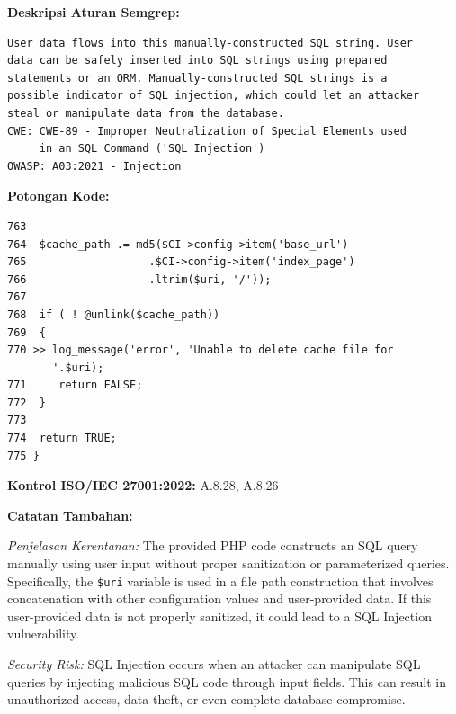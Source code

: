 \textbf{Deskripsi Aturan Semgrep:}
\begin{small}
\begin{lstlisting}[style=promptstyle]
User data flows into this manually-constructed SQL string. User
data can be safely inserted into SQL strings using prepared
statements or an ORM. Manually-constructed SQL strings is a
possible indicator of SQL injection, which could let an attacker
steal or manipulate data from the database.
CWE: CWE-89 - Improper Neutralization of Special Elements used
     in an SQL Command ('SQL Injection')
OWASP: A03:2021 - Injection
\end{lstlisting}
\end{small}
\newpage
\textbf{Potongan Kode:}
\begin{small}
\begin{lstlisting}[style=promptstyle]
763
764  $cache_path .= md5($CI->config->item('base_url')
765                   .$CI->config->item('index_page')
766                   .ltrim($uri, '/'));
767
768  if ( ! @unlink($cache_path))
769  {
770 >> log_message('error', 'Unable to delete cache file for 
       '.$uri);
771     return FALSE;
772  }
773
774  return TRUE;
775 }
\end{lstlisting}
\end{small}

\textbf{Kontrol ISO/IEC 27001:2022:} A.8.28, A.8.26

\bigskip
\textbf{Catatan Tambahan:}

\textit{Penjelasan Kerentanan:}
The provided PHP code constructs an SQL query manually using user
input without proper sanitization or parameterized queries. Specifically,
the \texttt{\$uri} variable is used in a file path construction that
involves concatenation with other configuration values and user-provided
data. If this user-provided data is not properly sanitized, it could
lead to a SQL Injection vulnerability.

\textit{Security Risk:}
SQL Injection occurs when an attacker can manipulate SQL queries by
injecting malicious SQL code through input fields. This can result in
unauthorized access, data theft, or even complete database compromise.

